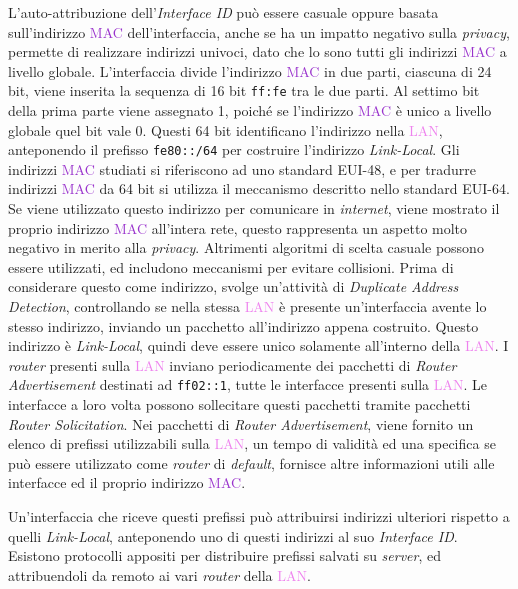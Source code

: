 \documentclass{article}
\numberwithin{equation}{subsection}
\begin{document}
L'auto-attribuzione dell'\textit{Interface ID} può essere casuale oppure basata sull'indirizzo \textcolor{DarkOrchid}{MAC} dell'interfaccia, anche se ha un impatto negativo sulla \textit{privacy}, permette di 
realizzare indirizzi univoci, dato che lo sono tutti gli indirizzi \textcolor{DarkOrchid}{MAC} a livello globale. L'interfaccia divide l'indirizzo \textcolor{DarkOrchid}{MAC} in due parti, ciascuna di 24 bit, 
viene inserita la sequenza di 16 bit \texttt{ff:fe} tra le due parti. Al settimo bit della prima parte viene assegnato 1, poiché se l'indirizzo \textcolor{DarkOrchid}{MAC} è unico a livello 
globale quel bit vale 0. 
Questi 64 bit identificano l'indirizzo nella \textcolor{violet}{LAN}, anteponendo il prefisso \texttt{fe80::/64} per costruire l'indirizzo \textit{Link-Local}. Gli indirizzi \textcolor{DarkOrchid}{MAC} studiati si riferiscono ad uno standard EUI-48, e per tradurre indirizzi 
\textcolor{DarkOrchid}{MAC} da 64 bit si utilizza il meccanismo descritto nello standard EUI-64. 
Se viene utilizzato questo indirizzo per comunicare in \textit{internet}, viene mostrato il proprio indirizzo \textcolor{DarkOrchid}{MAC} all'intera rete, questo rappresenta un aspetto molto negativo in merito alla 
\textit{privacy}. Altrimenti algoritmi di scelta casuale possono essere utilizzati, ed includono meccanismi per evitare collisioni. 
Prima di considerare questo come indirizzo, svolge un'attività di \textit{Duplicate Address Detection}, controllando se nella stessa \textcolor{violet}{LAN} è presente un'interfaccia 
avente lo stesso indirizzo, inviando un pacchetto all'indirizzo appena costruito. Questo indirizzo è \textit{Link-Local}, quindi deve essere unico solamente all'interno della \textcolor{violet}{LAN}. 
I \textit{router} presenti sulla \textcolor{violet}{LAN} inviano periodicamente dei pacchetti di \textit{Router Advertisement} destinati ad \texttt{ff02::1}, tutte le interfacce presenti sulla \textcolor{violet}{LAN}. Le interfacce a loro volta possono sollecitare questi pacchetti tramite pacchetti \textit{Router Solicitation}. 
Nei pacchetti di \textit{Router Advertisement}, viene fornito un elenco di prefissi utilizzabili sulla \textcolor{violet}{LAN}, un tempo di validità ed una specifica se può essere utilizzato come 
\textit{router} di \textit{default}, fornisce altre informazioni utili alle interfacce ed il proprio indirizzo \textcolor{DarkOrchid}{MAC}. 

Un'interfaccia che riceve questi prefissi può attribuirsi indirizzi ulteriori rispetto a quelli \textit{Link-Local}, anteponendo uno di questi indirizzi al suo \textit{Interface ID}. 
Esistono protocolli appositi per distribuire prefissi salvati su \textit{server}, ed attribuendoli da remoto ai vari \textit{router} della \textcolor{violet}{LAN}. 
\end{document}

